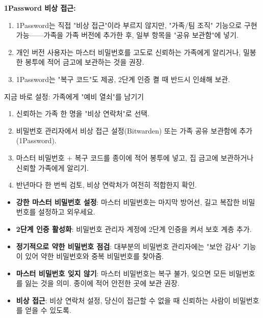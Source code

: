 \textbf{1Password 비상 접근:}

\begin{enumerate}
  \item 1Password는 직접 "비상 접근"이라 부르지 않지만, "가족/팀 조직" 기능으로 구현 가능——가족을 가족 버전에 추가한 후, 일부 항목을 "공유 보관함"에 넣기.
  \item 개인 버전 사용자는 마스터 비밀번호를 고도로 신뢰하는 가족에게 알리거나, 밀봉한 봉투에 적어 금고에 보관하는 것을 권장.
  \item 1Password는 "복구 코드"도 제공, 2단계 인증 켤 때 반드시 인쇄해 보관.
\end{enumerate}

\begin{tcbpractice}{지금 바로 설정: 가족에게 "예비 열쇠"를 남기기}
\begin{enumerate}
  \item 신뢰하는 가족 한 명을 "비상 연락처"로 선택.
  \item 비밀번호 관리자에서 비상 접근 설정(Bitwarden) 또는 가족 공유 보관함에 추가(1Password).
  \item 마스터 비밀번호 + 복구 코드를 종이에 적어 봉투에 넣고, 집 금고에 보관하거나 신뢰할 가족에게 알리기.
  \item 반년마다 한 번씩 검토, 비상 연락처가 여전히 적합한지 확인.
\end{enumerate}

\end{tcbpractice}


\begin{itemize}
  \item \textbf{강한 마스터 비밀번호 설정}: 마스터 비밀번호는 마지막 방어선, 길고 복잡한 비밀번호를 설정하고 외우세요.
  \item \textbf{2단계 인증 활성화}: 비밀번호 관리자 계정에 2단계 인증을 켜서 보호 계층 추가.
  \item \textbf{정기적으로 약한 비밀번호 점검}: 대부분의 비밀번호 관리자에는 "보안 감사" 기능이 있어 약한 비밀번호와 중복 비밀번호를 찾아줌.
  \item \textbf{마스터 비밀번호 잊지 않기}: 마스터 비밀번호는 복구 불가, 잊으면 모든 비밀번호를 잃는 것을 의미. 종이에 적어 안전한 곳에 보관 권장.
  \item \textbf{비상 접근}: 비상 연락처 설정, 당신이 접근할 수 없을 때 신뢰하는 사람이 비밀번호를 얻을 수 있도록.
\end{itemize}

